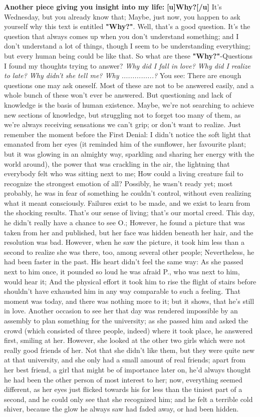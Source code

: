 \textbf{Another piece giving you insight into my life:}
\textbf{[u]Why?[/u]}
It's Wednesday, but you already know that; Maybe, just now, you happen to ask yourself why this text is entitled \textbf{"Why?"}. 
Well, that's a good question. 
It's the question that always comes up when you don't understand something; and I don't understand a lot of things, though I seem to be understanding everything; but every human being could be like that. 
So what are these \textbf{"Why?"}-Questions I found my thoughts trying to answer?
\emph{Why did I fall in love?
Why did I realize to late?
Why didn't she tell me?
Why ...............?}
You see: There are enough questions one may ask oneself. Most of these are not to be answered easily, and a whole bunch of these won't ever be answered. 
But questioning and lack of knowledge is the basis of human existence. 
Maybe, we're not searching to achieve new sections of knowledge, but struggling not to forget too many of them, as we're always receiving sensations we can't grip; or don't want to realize. 
Just remember the moment before the First Denial: I didn't notice the soft light that emanated from her eyes (it reminded him of the sunflower, her favourite plant; but it was glowing in an almighty way, sparkling and sharing her energy with the world around), the power that was crackling in the air, the lightning that everybody felt who was sitting next to me; How could a living creature fail to recognize the strongest emotion of all?
Possibly, he wasn't ready yet; most probably, he was in fear of something he couldn't control, without even realizing what it meant consciously. 
Failures exist to be made, and we exist to learn from the shocking results. 
That's our sense of living; that's our mortal creed. 
This day, he didn't really have a chance to see O.; However, he found a picture that was taken from her and published, but her face was hidden beneath her hair, and the resolution was bad. However, when he saw the picture, it took him less than a second to realize she was there, too, among several other people; Nevertheless, he had been faster in the past. 
His heart didn't feel the same way: As she passed next to him once, it pounded so loud he was afraid P., who was next to him, would hear it; And the physical effort it took him to rise the flight of stairs before shouldn't have exhausted him in any way comparable to such a feeling. 
That moment was today, and there was nothing more to it; but it shows, that he's still in love. 
Another occasion to see her that day was rendered impossible by an assembly to plan something for the university; as she passed him and asked the crowd (which consisted of three people, indeed) where it took place, he answered first, smiling at her. However, she looked at the other two girls which were not really good friends of her. Not that she didn't like them, but they were quite new at that university, and she only had a small amount of real friends; apart from her best friend, a girl that might be of importance later on, he'd always thought he had been the other person of most interest to her; now, everything seemed different, as her eyes just flicked towards his for less than the tiniest part of a second, and he could only see that she recognized him; and he felt a terrible cold shiver, because the glow he always saw had faded away, or had been hidden. 
